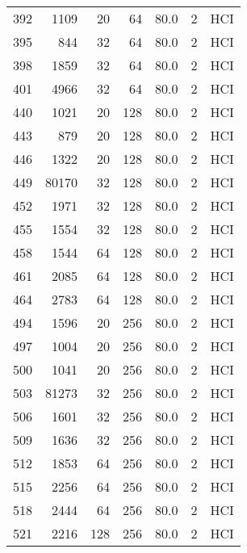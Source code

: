 \begin{longtable}{lrrrrrl}
392 &      1109 &         20 &        64 &           80.0 &       2 &  HCI \\
395 &       844 &         32 &        64 &           80.0 &       2 &  HCI \\
398 &      1859 &         32 &        64 &           80.0 &       2 &  HCI \\
401 &      4966 &         32 &        64 &           80.0 &       2 &  HCI \\
440 &      1021 &         20 &       128 &           80.0 &       2 &  HCI \\
443 &       879 &         20 &       128 &           80.0 &       2 &  HCI \\
446 &      1322 &         20 &       128 &           80.0 &       2 &  HCI \\
449 &     80170 &         32 &       128 &           80.0 &       2 &  HCI \\
452 &      1971 &         32 &       128 &           80.0 &       2 &  HCI \\
455 &      1554 &         32 &       128 &           80.0 &       2 &  HCI \\
458 &      1544 &         64 &       128 &           80.0 &       2 &  HCI \\
461 &      2085 &         64 &       128 &           80.0 &       2 &  HCI \\
464 &      2783 &         64 &       128 &           80.0 &       2 &  HCI \\
494 &      1596 &         20 &       256 &           80.0 &       2 &  HCI \\
497 &      1004 &         20 &       256 &           80.0 &       2 &  HCI \\
500 &      1041 &         20 &       256 &           80.0 &       2 &  HCI \\
503 &     81273 &         32 &       256 &           80.0 &       2 &  HCI \\
506 &      1601 &         32 &       256 &           80.0 &       2 &  HCI \\
509 &      1636 &         32 &       256 &           80.0 &       2 &  HCI \\
512 &      1853 &         64 &       256 &           80.0 &       2 &  HCI \\
515 &      2256 &         64 &       256 &           80.0 &       2 &  HCI \\
518 &      2444 &         64 &       256 &           80.0 &       2 &  HCI \\
521 &      2216 &        128 &       256 &           80.0 &       2 &  HCI \\

\end{longtable}
